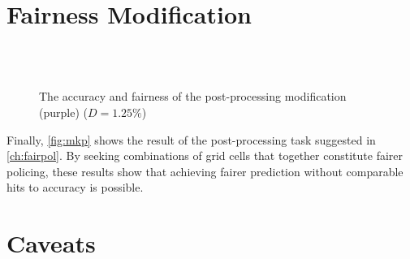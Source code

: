 \section{Fairness Modification}
\begin{figure}[bth]
    \myfloatalign
     \\
     \\
    \caption[The accuracy and fairness of the post-processing modification]{The accuracy and fairness of the post-processing modification (purple) ($D = 1.25\%$)}\label{fig:mkp}
\end{figure}
Finally, \autoref{fig:mkp} shows the result of the post-processing task suggested in \autoref{ch:fairpol}. By seeking combinations of grid cells that together constitute fairer policing, these results show that achieving fairer prediction without comparable hits to accuracy is possible.


\section{Caveats} \label{sec:caveats}

